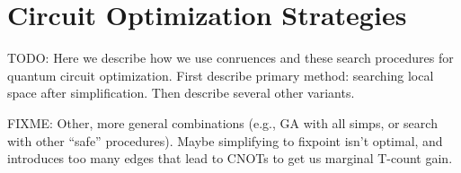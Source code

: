 
\section{Circuit Optimization Strategies}

TODO: Here we describe how we use conruences and these search procedures for quantum circuit optimization. First describe primary method: searching local space after simplification. Then describe several other variants.

FIXME: Other, more general combinations (e.g., GA with all simps, or search with other ``safe'' procedures). Maybe simplifying to fixpoint isn't optimal, and introduces too many edges that lead to CNOTs to get us marginal T-count gain.


